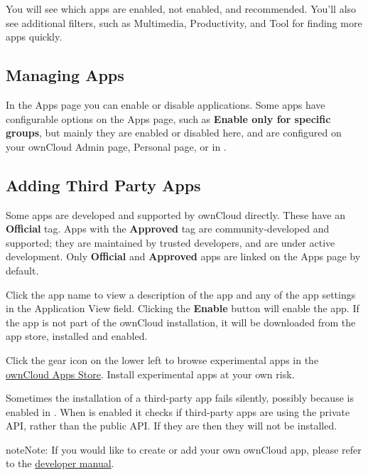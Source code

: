 \documentclass[letterpaper,10pt,english]{sphinxmanual}
\begin{document}
You will see which apps are enabled, not enabled, and recommended. You'll also
see additional filters, such as Multimedia, Productivity, and Tool for finding
more apps quickly.


\subsection{Managing Apps}
\label{installation/apps_management_installation:managing-apps}
In the Apps page you can enable or disable applications. Some apps have
configurable options on the Apps page, such as \textbf{Enable only for specific
groups}, but mainly they are enabled or disabled here, and are configured on
your ownCloud Admin page, Personal page, or in .


\subsection{Adding Third Party Apps}
\label{installation/apps_management_installation:adding-third-party-apps}
Some apps are developed and supported by ownCloud directly. These have an
\textbf{Official} tag. Apps with the \textbf{Approved} tag are community-developed and
supported; they are maintained by trusted developers, and are under active
development. Only \textbf{Official} and \textbf{Approved} apps are linked on the Apps
page by default.

Click the app name to view a description of the app and any of the app settings in the Application View field.  Clicking the \textbf{Enable} button will enable the app.  If the app is not part of the ownCloud installation, it will be downloaded from the app store, installed and enabled.

Click the gear icon on the lower left to browse experimental apps in the \href{https://apps.owncloud.com/}{ownCloud Apps
Store}. Install experimental apps at your own risk.

Sometimes the installation of a third-party app fails silently, possibly because
 is enabled in . When  is
enabled it checks if third-party apps are using the private API, rather than the public
API. If they are then they will not be installed.

\begin{notice}{note}{Note:}
If you would like to create or add your own ownCloud app, please
refer to the \href{https://doc.owncloud.org/server/9.0/developer\_manual/app/index.html}{developer manual}.
\end{notice}
\end{document}
